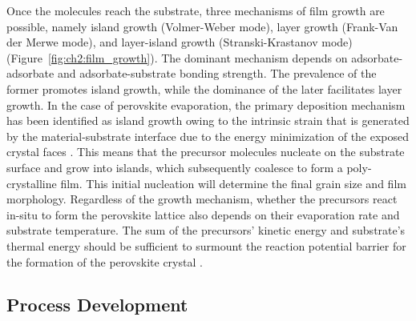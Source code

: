  
 Once the molecules reach the substrate, three mechanisms of film growth are possible, namely island growth (Volmer-Weber mode), layer growth (Frank-Van der Merwe mode), and layer-island growth (Stranski-Krastanov mode) (Figure~\ref{fig:ch2:film_growth})\cite{Wang2024ThermallyBeyond}. The dominant mechanism depends on adsorbate-adsorbate and adsorbate-substrate bonding strength. The prevalence of the former promotes island growth, while the dominance of the later facilitates layer growth. In the case of perovskite evaporation, the primary deposition mechanism has been identified as island growth owing to the intrinsic strain that is generated by the material-substrate interface due to the energy minimization of the exposed crystal faces \cite{Parrott2019GrowthFilms}. This means that the precursor molecules nucleate on the substrate surface and grow into islands, which subsequently coalesce to form a poly-crystalline film. This initial nucleation will determine the final grain size and film morphology. Regardless of the growth mechanism, whether the precursors react in-situ to form the perovskite lattice also depends on their evaporation rate and substrate temperature. The sum of the precursors' kinetic energy and substrate's thermal energy should be sufficient to surmount the reaction potential barrier for the formation of the perovskite crystal \cite{Dong2023GrowthFilm}. 

\subsection{Process Development}

